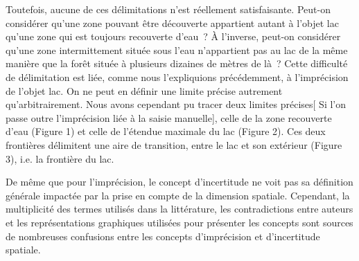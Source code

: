 Toutefois, aucune de ces délimitations n’est réellement
satisfaisante. Peut-on considérer qu’une zone pouvant être découverte
appartient autant à l’objet lac qu’une zone qui est toujours
recouverte d’eau ? À l’inverse, peut-on considérer qu’une zone
intermittement située sous l’eau n’appartient pas au lac de la même
manière que la forêt située à plusieurs dizaines de mètres de là ?
Cette difficulté de délimitation est liée, comme nous l’expliquions
précédemment, à l’imprécision de l’objet lac. On ne peut en définir
une limite précise autrement qu’arbitrairement. Nous avons cependant
pu tracer deux limites précises[ Si l’on passe outre l’imprécision
liée à la saisie manuelle], celle de la zone recouverte d’eau (Figure
1) et celle de l’étendue maximale du lac (Figure 2). Ces deux
frontières délimitent une aire de transition, entre le lac et son
extérieur (Figure 3), i.e. la frontière du lac.

De même que pour l’imprécision, le concept d’incertitude ne voit pas
sa définition générale impactée par la prise en compte de la dimension
spatiale. Cependant, la multiplicité des termes utilisés dans la
littérature, les contradictions entre auteurs et les représentations
graphiques utilisées pour présenter les concepts sont sources de
nombreuses confusions entre les concepts d’imprécision et
d’incertitude spatiale.


